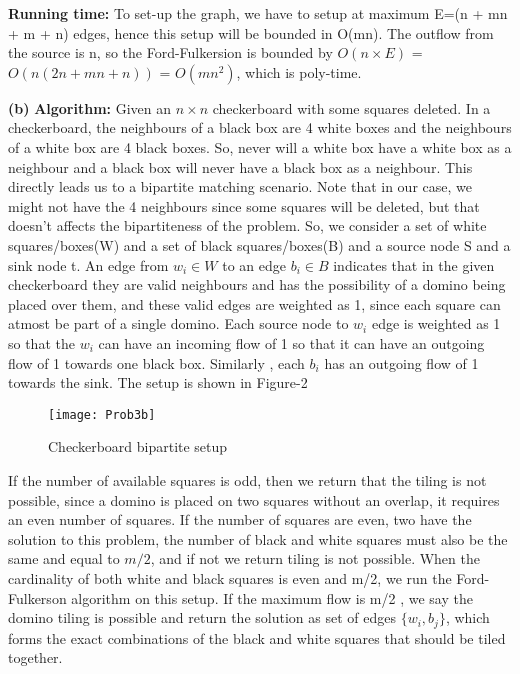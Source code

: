 \documentclass{article}
\renewcommand\part[1]{\vspace{.10in}\textbf{(#1)}}
\newcommand\algo{\vspace{.10in}\textbf{Algorithm: }}
\newcommand\runtime{\vspace{.10in}\textbf{Running time: }}
\begin{document}
  \runtime  To set-up the graph, we have to setup at maximum E=(n + mn + m + n) edges, hence this setup will be bounded in O(mn). The outflow from the source is n, so the Ford-Fulkersion is bounded by $O(n \times E)$ = $O(n(2n+mn+n))$ = $O(mn^2)$, which is poly-time.


  \part{b}
  \algo Given an $n \times n$ checkerboard with some squares deleted. In a checkerboard, the neighbours of a black box are 4 white boxes and the neighbours of a white box are 4 black boxes. So, never will a white box have a white box as a neighbour and a black box will never have a black box as a neighbour. This directly leads us to a bipartite matching scenario. Note that in our case, we might not have the 4 neighbours since some squares will be deleted, but that doesn't affects the bipartiteness of the problem. So, we consider a set of white squares/boxes(W) and a set of black squares/boxes(B) and a source node S and a sink node t. An edge from $w_i \in W$ to an edge $b_i \in B$ indicates that in the given checkerboard they are valid neighbours and has the possibility of a domino being placed over them, and these valid edges are weighted as 1, since each square can atmost be part of a single domino. Each source node to $w_i$ edge is weighted as 1 so that the $w_i$ can have an incoming flow of 1 so that it can have an outgoing flow of 1 towards one black box. Similarly , each $b_i$ has an outgoing flow of 1 towards the sink. The setup is shown in Figure-2
  \begin{figure}[H]
   \centering
  \texttt{[image: Prob3b]}
  \caption{Checkerboard bipartite setup}
  \end{figure}

  If the number of available squares is odd, then we return that the tiling is not possible, since a domino is placed on two squares without an overlap, it requires an even number of squares. If the number of squares are even, two have the solution to this problem, the number of black and white squares must also be the same and equal to $m/2$, and if not we return tiling is not possible. When the cardinality of both white and black squares is even and m/2, we run the Ford-Fulkerson algorithm on this setup. If the maximum flow is m/2 , we say the domino tiling is possible and return the solution as set of edges $\{w_i,b_j\}$, which forms the exact combinations of the black and white squares that should be tiled together. \newline
\end{document}
